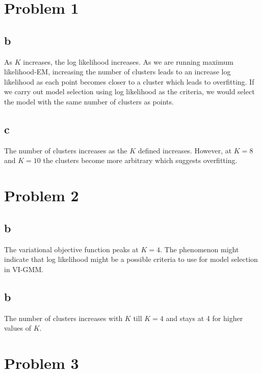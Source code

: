 \documentclass[twoside]{homework}
\begin{document}
\maketitle

\section*{Problem 1}
\subsection*{b}
As $K$ increases, the log likelihood increases. As we are running maximum likelihood-EM, increasing the number of clusters leads to an increase log likelihood as each point becomes closer to a cluster which leads to overfitting. If we carry out model selection using log likelihood as the criteria, we would select the model with the same number of clusters as points. 

\subsection*{c}
The number of clusters increases as the $K$ defined increases. However, at $K=8$ and $K=10$ the clusters become more arbitrary which suggests overfitting. 

\newpage

 \section*{Problem 2}
 \subsection*{b}
 The variational objective function peaks at $K=4$. The phenomenon might indicate that log likelihood might be a possible criteria to use for model selection in VI-GMM.
 
 \subsection*{b}
The number of clusters increases with $K$ till $K=4$ and stays at 4 for higher values of $K$.

\newpage

 \section*{Problem 3}
 
 
 
\end{document}
